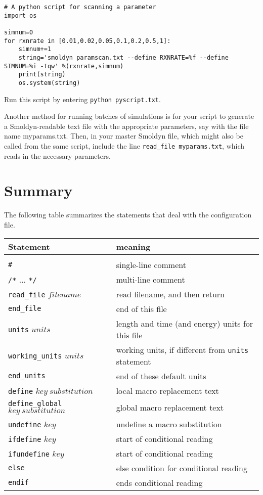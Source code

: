 \documentclass {scrbook}
\newcommand {\ttt} {\texttt}
\begin{document}
\begin{lstlisting}[style=SSAPython]
# A python script for scanning a parameter
import os

simnum=0
for rxnrate in [0.01,0.02,0.05,0.1,0.2,0.5,1]:
	simnum+=1
	string='smoldyn paramscan.txt --define RXNRATE=%f --define SIMNUM=%i -tqw' %(rxnrate,simnum)
	print(string)
	os.system(string)
\end{lstlisting}
Run this script by entering \ttt{python pyscript.txt}.

Another method for running batches of simulations is for your script to generate a Smoldyn-readable text file with the appropriate parameters, say with the file name myparams.txt. Then, in your master Smoldyn file, which might also be called from the same script, include the line \ttt{read\_file myparams.txt}, which reads in the necessary parameters.

\section{Summary}

The following table summarizes the statements that deal with the configuration file.

\begin{longtable}[c]{ll}
Statement & meaning\\
\hline\\
\ttt{\#} & single-line comment\\
\ttt{/*} ... \ttt{*/} & multi-line comment\\
\ttt{read\_file} $filename$ & read filename, and then return\\
\ttt{end\_file} & end of this file\\
\ttt{units} $units$ & length and time (and energy) units for this file\\
\ttt{working\_units} $units$ & working units, if different from \ttt{units} statement\\
\ttt{end\_units} & end of these default units\\
\ttt{define} $key\ substitution$ & local macro replacement text\\
\ttt{define\_global} $key\ substitution$ & global macro replacement text\\
\ttt{undefine} $key$ & undefine a macro substitution\\
\ttt{ifdefine} $key$ & start of conditional reading\\
\ttt{ifundefine} $key$ & start of conditional reading\\
\ttt{else} & else condition for conditional reading\\
\ttt{endif} & ends conditional reading\\
\end{longtable}
\end{document}
